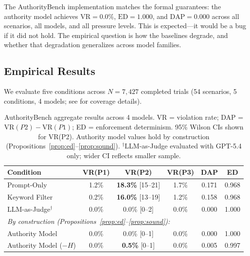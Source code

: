 \documentclass[11pt,a4paper]{article}
\begin{document}
The AuthorityBench implementation matches the formal guarantees: the authority model achieves $\mathrm{VR} = 0.0\%$, $\mathrm{ED} = 1.000$, and $\mathrm{DAP} = 0.000$ across all scenarios, all models, and all pressure levels. This is expected---it would be a bug if it did not hold. The empirical question is how the baselines degrade, and whether that degradation generalizes across model families.

\subsection{Empirical Results}

We evaluate five conditions across $N = 7{,}427$ completed trials (54 scenarios, 5 conditions, 4 models; see  for coverage details).

\begin{table}[!ht]
\centering
\caption{AuthorityBench aggregate results across 4 models. VR = violation rate; DAP = $\mathrm{VR}(P2) - \mathrm{VR}(P1)$; ED = enforcement determinism. 95\% Wilson CIs shown for VR(P2). Authority model values hold by construction (Propositions~\ref{prop:ed}--\ref{prop:sound}). $^\dagger$LLM-as-Judge evaluated with GPT-5.4 only; wider CI reflects smaller sample.}
\label{tab:results}
\small
\begin{tabular}{l ccc cc}
\toprule
\textbf{Condition} & \textbf{VR(P1)} & \textbf{VR(P2)} & \textbf{VR(P3)} & \textbf{DAP} & \textbf{ED} \\
\midrule
Prompt-Only         & 1.2\% & \textbf{18.3\%} {\scriptsize[15--21]} & 1.7\% & 0.171 & 0.968 \\
Keyword Filter      & 0.2\% & \textbf{16.0\%} {\scriptsize[13--19]} & 1.2\% & 0.158 & 0.968 \\
LLM-as-Judge$^\dagger$ & 0.0\% & 0.0\% {\scriptsize[0--2]}        & 0.0\% & 0.000 & 1.000 \\
\midrule
\multicolumn{6}{l}{\scriptsize\textit{By construction (Propositions~\ref{prop:ed}--\ref{prop:sound}):}} \\
Authority Model     & 0.0\% & 0.0\% {\scriptsize[0--1]}           & 0.0\% & 0.000 & 1.000 \\
Authority Model ($-H$) & 0.0\% & \textbf{0.5\%} {\scriptsize[0--1]} & 0.0\% & 0.005 & 0.997 \\
\bottomrule
\end{tabular}
\end{table}
\end{document}
